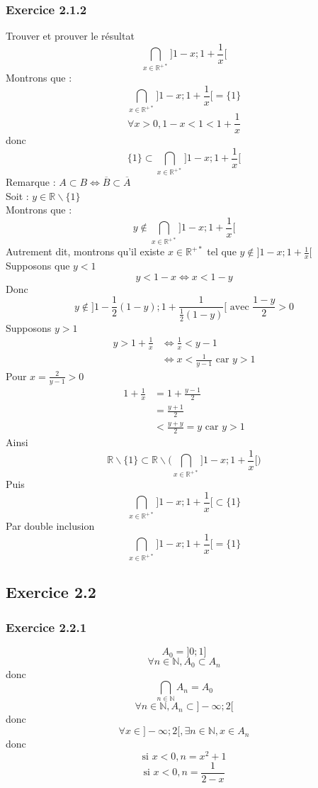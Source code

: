 \documentclass[a4paper,12pt]{article}
\begin{document}
\subsubsection*{Exercice 2.1.2}
Trouver et prouver le résultat
\[
\bigcap_{x \in \mathbb{R}^{+*}} \Big] 1-x ; 1 + \frac{1}{x} \Big[
\]
Montrons que :
\[
\bigcap_{x \in \mathbb{R}^{+*}} \Big] 1-x ; 1 + \frac{1}{x} \Big[ = \{1\}
\]
\[
\forall x > 0, 1 - x < 1 < 1 + \frac{1}{x}
\]
donc 
\[
\{1\} \subset \bigcap_{x \in \mathbb{R}^{+*}} \Big] 1-x ; 1 + \frac{1}{x} \Big[
\]
Remarque : $A \subset B \Leftrightarrow \overline{B} \subset \overline{A}$\\
Soit : $y \in \mathbb{R} \backslash \{1\}$ \\
Montrons que :
\[
y \not\in \bigcap_{x \in \mathbb{R}^{+*}} \Big] 1-x ; 1 + \frac{1}{x} \Big[
\]
Autrement dit, montrons qu'il existe $x \in \mathbb{R}^{+*}$ tel que $y \not\in ] 1-x ; 1 + \frac{1}{x} [$\\
Supposons que $y < 1$
\[
y < 1 - x \Leftrightarrow x < 1 - y 
\]
Donc
\[
y \not\in \Big] 1 - \frac{1}{2} (1 - y) ; 1 + \frac{1}{\frac{1}{2} (1-y)} \Big[ \text{ avec } \frac{1 - y}{2} > 0
\]
Supposons $y > 1$
\[
\begin{aligned}
y > 1 + \frac{1}{x} &\Leftrightarrow \frac{1}{x} < y - 1\\
& \Leftrightarrow x < \frac{1}{y-1} \text{ car } y > 1
\end{aligned}
\]
Pour $x = \frac{2}{y - 1} > 0$
\[
\begin{aligned}
1 + \frac{1}{x} &= 1 + \frac{y-1}{2}\\
&= \frac{y + 1}{2}\\
&< \frac{y + y}{2} = y \text{ car } y > 1 
\end{aligned}
\]
Ainsi $$\mathbb{R}\backslash \{1\} \subset \mathbb{R}\backslash \Big(\bigcap_{x \in \mathbb{R}^{+*}} \Big] 1-x ; 1 + \frac{1}{x} \Big[\Big)$$ Puis $$ \bigcap_{x \in \mathbb{R}^{+*}} \Big] 1-x ; 1 + \frac{1}{x} \Big[ \subset \{1\}$$
Par double inclusion $$\bigcap_{x \in \mathbb{R}^{+*}} \Big] 1-x ; 1 + \frac{1}{x} \Big[ = \{1\}$$
\subsection{Exercice 2.2}
\subsubsection{Exercice 2.2.1}
$$A_0 = ] 0 ; 1 ]$$
$$\forall n \in \mathbb{N}, A_0 \subset A_n$$
donc 
$$\bigcap_{n\in\mathbb{N}} A_n = A_0$$
$$\forall n \in \mathbb{N}, A_n \subset ] -\infty ; 2 [$$
donc 
$$\forall x \in ] -\infty ; 2 [, \exists n \in \mathbb{N}, x \in A_n $$
donc 
$$ \text{si } x < 0, n = x^2 + 1$$
$$ \text{si } x < 0, n = \frac{1}{2-x}$$
\end{document}
